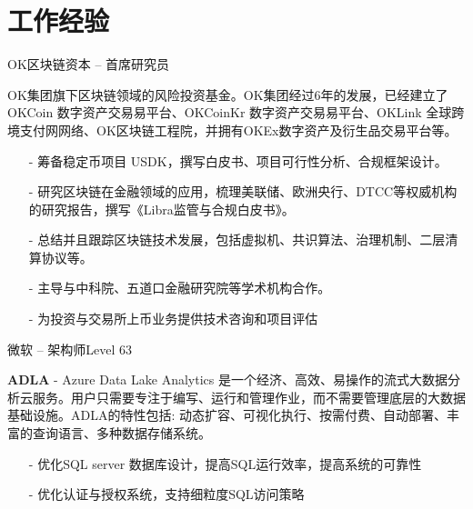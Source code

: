 \documentclass[10pt,a4paper]{moderncv}
\begin{document}
\section{工作经验}
\vspace{2ex}
	{OK区块链资本 -- 首席研究员}{}{}{}{}

\vspace{1ex}
{
    OK集团旗下区块链领域的风险投资基金。OK集团经过6年的发展，已经建⽴了 OKCoin 数字资产交易易平台、OKCoinKr 数字资产交易易平台、OKLink 全球跨境⽀付⽹网络、OK区块链工程院，并拥有OKEx数字资产及衍⽣品交易平台等。%
    \begin{itemize}
        \item[-] 筹备稳定币项目 USDK，撰写白皮书、项目可行性分析、合规框架设计。
        \item[-] 研究区块链在金融领域的应用，梳理美联储、欧洲央行、DTCC等权威机构的研究报告，撰写《Libra监管与合规白皮书》。
        \item[-] 总结并且跟踪区块链技术发展，包括虚拟机、共识算法、治理机制、二层清算协议等。
        \item[-] 主导与中科院、五道口金融研究院等学术机构合作。
        \item[-] 为投资与交易所上币业务提供技术咨询和项目评估
    \end{itemize}
}
\vspace{2ex}

	{微软 -- 架构师}{Level 63}{}{}{}

\vspace{1ex}
{
    \textbf{ADLA} - Azure Data Lake Analytics 是一个经济、高效、易操作的流式大数据分析云服务。用户只需要专注于编写、运行和管理作业，而不需要管理底层的大数据基础设施。ADLA的特性包括: 动态扩容、可视化执行、按需付费、自动部署、丰富的查询语言、多种数据存储系统。
    \begin{itemize}
		\item[-] 优化SQL server 数据库设计，提高SQL运行效率，提高系统的可靠性
		\item[-] 优化认证与授权系统，支持细粒度SQL访问策略
	\end{itemize}
}
\vspace{2ex}
\end{document}
